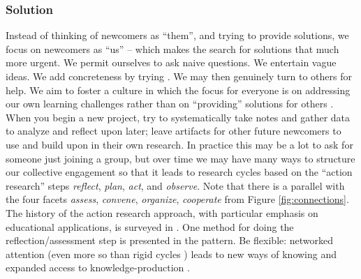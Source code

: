 \subsubsection*{Solution}

Instead of thinking of newcomers as ``them'', and trying to provide
solutions, we focus on newcomers as ``us'' -- which makes the search
for solutions that much more urgent.  We permit ourselves to ask naive
questions.  We entertain vague ideas.  We add concreteness by trying
.  We may then genuinely turn to
others for help.
We aim to foster a culture in which the focus for everyone is on
addressing our own learning challenges rather than on ``providing''
solutions for others \cite{boud2005peer}.
%
When you begin a new project, try to systematically take notes and
gather data to analyze and reflect upon later; leave artifacts for
other future newcomers to use and build upon in their own research.
In practice this may be a lot to ask for someone just joining a group,
but over time we may have many ways to structure our collective
engagement so that it leads to research cycles based on the ``action
research'' steps \emph{reflect}, \emph{plan}, \emph{act}, and
\emph{observe}.
Note that there is a parallel with the four facets \emph{assess},
\emph{convene}, \emph{organize}, \emph{cooperate} from Figure
\ref{fig:connections}.  The history of the action research approach,
with particular emphasis on educational applications, is surveyed in
\cite[Chapter 3]{mcniff2013action}.  One method for doing the
reflection\slash assessment step is presented in the
 pattern.
Be flexible: networked attention (even more so than rigid cycles
\cite{engestrom199923}) leads to new ways of knowing and expanded
access to knowledge-production \cite{gilbert2012being,wagner2008new}.


%
